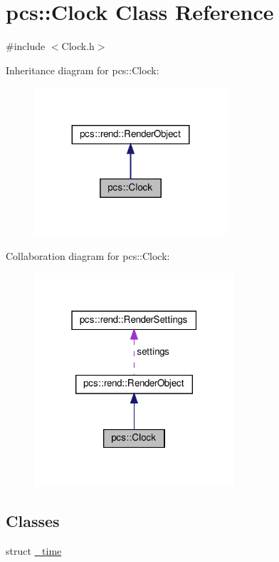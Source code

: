 \hypertarget{classpcs_1_1Clock}{}\section{pcs\+:\+:Clock Class Reference}
\label{classpcs_1_1Clock}


{\ttfamily \#include $<$Clock.\+h$>$}



Inheritance diagram for pcs\+:\+:Clock\+:
\nopagebreak
\begin{figure}[H]
\begin{center}
\leavevmode
\includegraphics[width=203pt]{classpcs_1_1Clock__inherit__graph}
\end{center}
\end{figure}


Collaboration diagram for pcs\+:\+:Clock\+:
\nopagebreak
\begin{figure}[H]
\begin{center}
\leavevmode
\includegraphics[width=211pt]{classpcs_1_1Clock__coll__graph}
\end{center}
\end{figure}
\subsection*{Classes}
\begin{DoxyCompactItemize}
\item 
struct \hyperlink{structpcs_1_1Clock_1_1__time}{\+\_\+time}
\end{DoxyCompactItemize}
